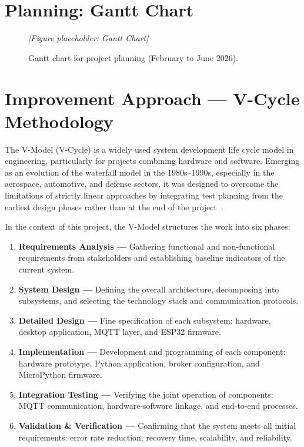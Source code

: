 \section{Planning: Gantt Chart}
\label{sec:planning}

\begin{figure}[H]
  \centering
  \textit{[Figure placeholder: Gantt Chart]}
  \caption{Gantt chart for project planning (February to June 2026).}
  \label{fig:gantt}
\end{figure}

\section{Improvement Approach --- V-Cycle Methodology}
\label{sec:vcycle}

The V-Model (V-Cycle) is a widely used system development life cycle model in engineering, particularly for projects combining hardware and software. Emerging as an evolution of the waterfall model in the 1980s--1990s, especially in the aerospace, automotive, and defense sectors, it was designed to overcome the limitations of strictly linear approaches by integrating test planning from the earliest design phases rather than at the end of the project~\cite{hercog2022pick}.

In the context of this project, the V-Model structures the work into six phases:

\begin{enumerate}
  \item \textbf{Requirements Analysis ---} Gathering functional and non-functional requirements from stakeholders and establishing baseline indicators of the current system.
  \item \textbf{System Design ---} Defining the overall architecture, decomposing into subsystems, and selecting the technology stack and communication protocols.
  \item \textbf{Detailed Design ---} Fine specification of each subsystem: hardware, desktop application, MQTT layer, and ESP32 firmware.
  \item \textbf{Implementation ---} Development and programming of each component: hardware prototype, Python application, broker configuration, and MicroPython firmware.
  \item \textbf{Integration Testing ---} Verifying the joint operation of components: MQTT communication, hardware-software linkage, and end-to-end processes.
  \item \textbf{Validation \& Verification ---} Confirming that the system meets all initial requirements: error rate reduction, recovery time, scalability, and reliability.
\end{enumerate}

